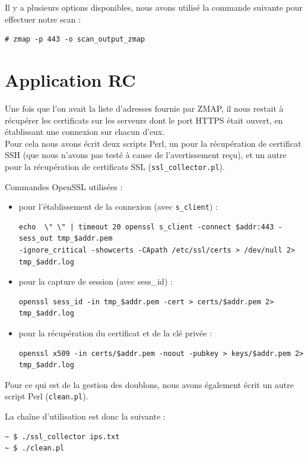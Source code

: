 Il y a plusieurs options disponibles, nous avons utilisé la commande suivante pour effectuer notre scan :
\begin{verbatim}
# zmap -p 443 -o scan_output_zmap
\end{verbatim}

\section{Application RC}

Une fois que l'on avait la liste d'adresses fournie par ZMAP, il nous restait à récupérer les certificats sur les serveurs dont le port HTTPS était ouvert, en établissant une connexion sur chacun d'eux.\\


Pour cela nous avons écrit deux scripts Perl, un pour la récupération de certificat SSH (que nous n'avons pas testé à cause de l'avertissement reçu), et un autre pour la récupération de certificats SSL (\verb+ssl_collector.pl+).

Commandes OpenSSL utilisées :
\begin{itemize}
\item pour l'établissement de la connexion (avec \verb+s_client+) :

\begin{verbatim}
echo  \" \" | timeout 20 openssl s_client -connect $addr:443 -sess_out tmp_$addr.pem 
-ignore_critical -showcerts -CApath /etc/ssl/certs > /dev/null 2> tmp_$addr.log
\end{verbatim}
\item  pour la capture de session (avec sess\_id) :
\begin{verbatim}
openssl sess_id -in tmp_$addr.pem -cert > certs/$addr.pem 2> tmp_$addr.log
\end{verbatim}
\item pour la récupération du certificat et de la clé privée :
\begin{verbatim}
openssl x509 -in certs/$addr.pem -noout -pubkey > keys/$addr.pem 2> tmp_$addr.log
\end{verbatim}
\end{itemize}

Pour ce qui est de la gestion des doublons, nous avons également écrit un autre script Perl (\verb+clean.pl+).

La chaîne d'utilisation est donc la suivante :
\begin{verbatim}
~ $ ./ssl_collector ips.txt
~ $ ./clean.pl
\end{verbatim}

